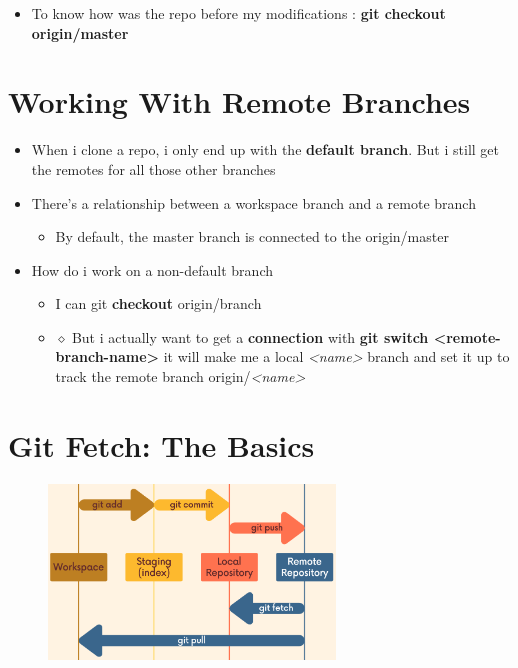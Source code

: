 \documentclass{report}
\begin{document}
\begin{itemize}
	\item To know how was the repo before my modifications : \textbf{git checkout origin/master} 
\end{itemize}


\section{Working With Remote Branches}

\begin{itemize}
	\item When i clone a repo, i only end up with the \textbf{default branch}. But i still get the remotes for all those other branches 
	\item There's a relationship between a workspace branch and a remote branch
		\begin{itemize}
			\item By default, the master branch is connected to the origin/master 
		\end{itemize}
	\item How do i work on a non-default branch
		\begin{itemize}
			\item I can git \textbf{checkout} origin/branch 
			\item $\diamond$ But i actually want to get a \textbf{connection} with \textbf{git switch <remote-branch-name>} it will make me a local \textit{<name>} branch and set it up to track the remote branch origin/\textit{<name>}
		\end{itemize}
\end{itemize}


\section{Git Fetch: The Basics}

\begin{figure}[H] 
	 \centering 
	 \includegraphics[width=3in]{screenshots/2022-07-08T16-53-13Z.png} 
 \end{figure}
\end{document}
